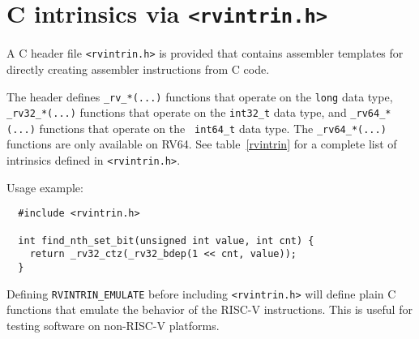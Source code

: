 \section{C intrinsics via {\tt <rvintrin.h>}}

A C header file {\tt <rvintrin.h>} is provided that contains assembler
templates for directly creating assembler instructions from C code.

The header defines {\tt \_rv\_*(...)} functions that operate on the {\tt long}
data type, {\tt \_rv32\_*(...)} functions that operate on the {\tt int32\_t}
data type, and {\tt \_rv64\_*(...)} functions that operate on the {\tt
int64\_t} data type. The {\tt \_rv64\_*(...)} functions are only available on
RV64. See table~\ref{rvintrin} for a complete list of intrinsics defined in
{\tt <rvintrin.h>}.

Usage example:

\begin{minipage}{\linewidth}
\begin{verbatim}
  #include <rvintrin.h>

  int find_nth_set_bit(unsigned int value, int cnt) {
    return _rv32_ctz(_rv32_bdep(1 << cnt, value));
  }
\end{verbatim}
\end{minipage}

Defining {\tt RVINTRIN\_EMULATE} before including {\tt <rvintrin.h>} will
define plain C functions that emulate the behavior of the RISC-V instructions.
This is useful for testing software on non-RISC-V platforms.
